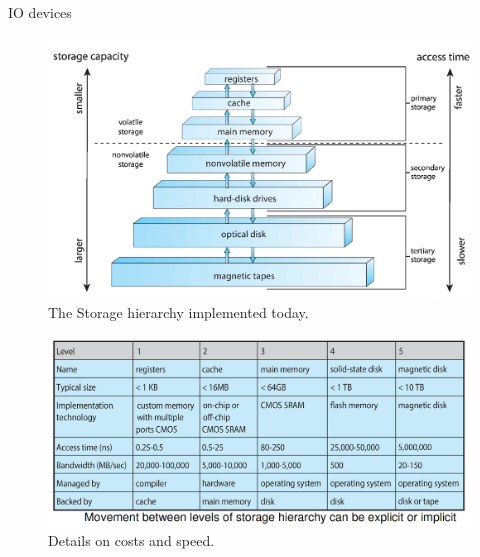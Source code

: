 \documentclass[10pt]{beamer}
\begin{document}
\begin{frame}[allowframebreaks]{IO devices}
 \begin{figure}
       \begin{center}
       \includegraphics[keepaspectratio, width=\textwidth,height=0.9\textheight-4\baselineskip]{img/207_storage_hierarchy.png}
      \end{center}
      \caption{The Storage hierarchy implemented today.~\autocite{stallings}}
      \end{figure}
      \framebreak
      \begin{figure}
       \begin{center}
       \includegraphics[keepaspectratio, width=\textwidth,height=0.9\textheight-4\baselineskip]{img/207_storage_details.png}
      \end{center}
      \caption{Details on costs and speed.~\autocite{stallings}}
      \end{figure}
      \framebreak
        \begin{figure}
       \begin{center}

\end{center}
\end{figure}
\end{frame}
\end{document}
